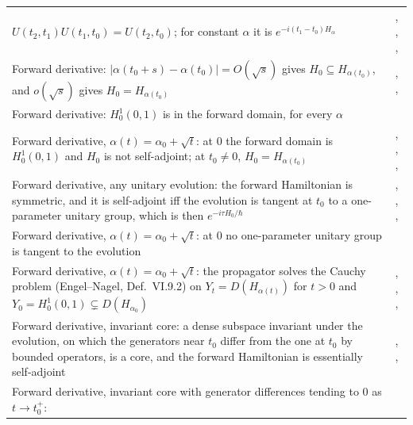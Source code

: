 \documentclass[11pt]{article}
\begin{document}
\begin{xltabular}{\textwidth}{@{}BL@{}}
  $U(t_2,t_1)U(t_1,t_0) = U(t_2,t_0)$; for constant $\alpha$ it is $e^{-i(t_1-t_0)H_\alpha}$ &
  , , ,
   \\
Forward derivative: $|\alpha(t_0+s) - \alpha(t_0)| = O(\sqrt s)$ gives
  $H_0 \subseteq H_{\alpha(t_0)}$, and $o(\sqrt s)$ gives $H_0 = H_{\alpha(t_0)}$ &
  , ,
   \\
Forward derivative: $H^1_0(0,1)$ is in the forward domain, for every $\alpha$ &
   \\
Forward derivative, $\alpha(t) = \alpha_0 + \sqrt t$: at $0$ the forward domain is $H^1_0(0,1)$
  and $H_0$ is not self-adjoint; at $t_0 \ne 0$, $H_0 = H_{\alpha(t_0)}$ &
  , ,
  ,  \\
Forward derivative, any unitary evolution: the forward Hamiltonian is symmetric, and it is
  self-adjoint iff the evolution is tangent at $t_0$ to a one-parameter unitary group, which is
  then $e^{-i\tau H_0/\hbar}$ &
  , ,
  ,  \\
Forward derivative, $\alpha(t) = \alpha_0 + \sqrt t$: at $0$ no one-parameter unitary group is
  tangent to the evolution &  \\
Forward derivative, $\alpha(t) = \alpha_0 + \sqrt t$: the propagator solves the Cauchy problem
  (Engel--Nagel, Def.~VI.9.2) on $Y_t = D(H_{\alpha(t)})$ for $t > 0$ and
  $Y_0 = H^1_0(0,1) \subsetneq D(H_{\alpha_0})$ &
  , ,
  ,  \\
Forward derivative, invariant core: a dense subspace invariant under the evolution, on which the
  generators near $t_0$ differ from the one at $t_0$ by bounded operators, is a core, and the
  forward Hamiltonian is essentially self-adjoint &
  , ,
   \\
Forward derivative, invariant core with generator differences tending to $0$ as $t \to t_0^+$:

\end{xltabular}
\end{document}
